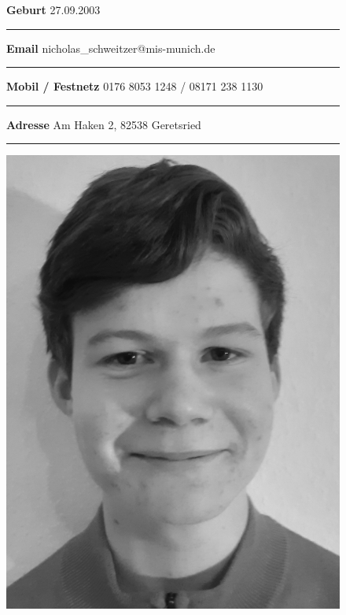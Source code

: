 \documentclass[12pt]{article}
\newcommand{\sep}{{\color{gray}\vspace{-12pt}\hrule}}
\begin{document}
\begin{figure}[htb!]
  \begin{minipage}{0.7\textwidth}
    \textbf{Geburt} \hfill{27.09.2003} \, \\
    \sep
    \vspace{7pt}
    \textbf{Email} \hfill{nicholas\_schweitzer@mis-munich.de} \, \\
    \sep
    \vspace{7pt}
    \textbf{Mobil / Festnetz} \hfill{0176 8053 1248 / 08171 238 1130} \, \\
    \sep
    \vspace{7pt}
    \textbf{Adresse} \hfill{Am Haken 2, 82538 Geretsried \, }\\
    \sep
    \vspace{7pt}
  \end{minipage}
  \begin{minipage}{0.29\textwidth}
    \hfill
    \includegraphics[trim=-50 -100 0 0mm, scale=0.05]{picture-cropped-grayscale.png}
  \end{minipage}
\end{figure}
\vspace{-30pt}
\end{document}
